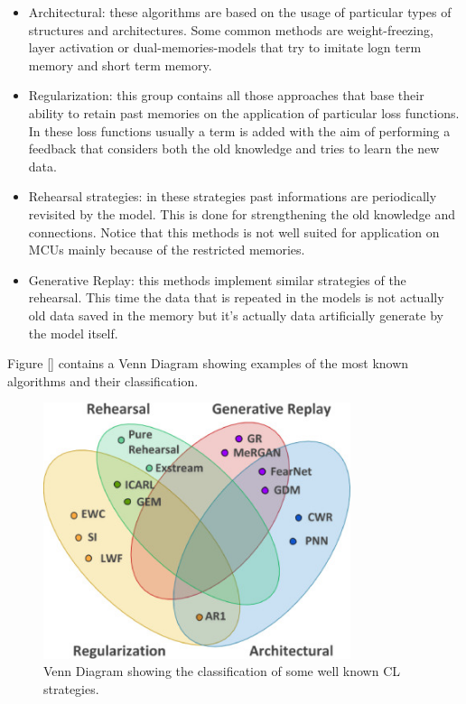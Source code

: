 \documentclass[12pt]{report}
\begin{document}
\begin{itemize}
\item Architectural: these algorithms are based on the usage of particular types of structures and architectures. Some common methods are weight-freezing, layer activation or dual-memories-models that try to imitate logn term memory and short term memory.
\item Regularization: this group contains all those approaches that base their ability to retain past memories on the application of particular loss functions. In these loss functions usually a term is added with the aim of performing a feedback that considers both the old knowledge and tries to learn the new data.
\item Rehearsal strategies: in these strategies past informations are periodically revisited by the model. This is done for strengthening the old knowledge and connections. Notice that this methods is not well suited for application on MCUs mainly because of the restricted memories. 
\item Generative Replay: this methods implement similar strategies of the rehearsal. This time the data that is repeated in the models is not actually old data saved in the memory but it's actually data artificially generate by the model itself. 
\end{itemize} 

Figure \ref{} contains a Venn Diagram showing examples of the most known algorithms and their classification.

\begin{figure}[h!]
    \centering
    \includegraphics[width=90mm]{Figures/Chapter1/CL_algorithms.jpg} 
    \caption{Venn Diagram showing the classification of some well known CL strategies.}
    \label{fig:CL_strategies}    
\end{figure}  
\end{document}
